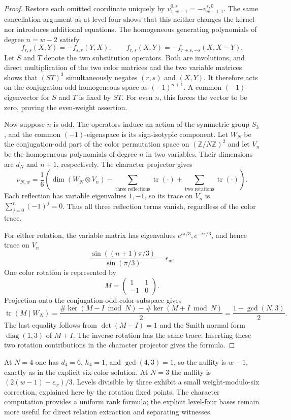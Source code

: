 \documentclass[11pt]{article}
\numberwithin{equation}{section}
\theoremstyle{plain}
\theoremstyle{definition}
\theoremstyle{remark}
\begin{document}
\begin{proof}
Restore each omitted coordinate uniquely by
$v^{0,s}_{1,w-1}=-v^{s,0}_{w-1,1}$. The same cancellation argument as
at level four shows that this neither changes the kernel nor introduces
additional equations. The homogeneous generating polynomials of degree
$n=w-2$ satisfy
\[
 f_{r,s}(X,Y)=-f_{s,r}(Y,X),\qquad
 f_{r,s}(X,Y)=-f_{r+s,-s}(X,X-Y).
\]
Let $S$ and $T$ denote the two substitution operators. Both are
involutions, and direct multiplication of the two color matrices and
the two variable matrices shows that $(ST)^3$ simultaneously negates
$(r,s)$ and $(X,Y)$. It therefore acts on the conjugation-odd homogeneous
space as $(-1)^{n+1}$. A common $(-1)$-eigenvector for $S$ and $T$ is
fixed by $ST$. For even $n$, this forces the vector to be zero, proving
the even-weight assertion.

Now suppose $n$ is odd. The operators induce an action of the symmetric
group $S_3$, and the common $(-1)$-eigenspace is its sign-isotypic
component. Let $W_N$ be the conjugation-odd part of the color permutation
space on $(\mathbb Z/N\mathbb Z)^2$ and let $V_n$ be the homogeneous
polynomials of degree $n$ in two variables. Their dimensions are $d_N$
and $n+1$, respectively. The character projector gives
\[
 \nu_{N,w}=\frac16\left(
 \dim(W_N\otimes V_n)
 -\sum_{\text{three reflections}}\operatorname{tr}(\cdot)
 +\sum_{\text{two rotations}}\operatorname{tr}(\cdot)\right).
\]
Each reflection has variable eigenvalues $1,-1$, so its trace on
$V_n$ is $\sum_{j=0}^n(-1)^j=0$. Thus all three reflection terms vanish,
regardless of the color trace.

For either rotation, the variable matrix has eigenvalues
$e^{i\pi/3},e^{-i\pi/3}$, and hence trace on $V_n$
\[
 \frac{\sin((n+1)\pi/3)}{\sin(\pi/3)}=\epsilon_w.
\]
One color rotation is represented by
\[
 M=\begin{pmatrix}1&1\\-1&0\end{pmatrix}.
\]
Projection onto the conjugation-odd color subspace gives
\[
 \operatorname{tr}(M\mid W_N)
 =\frac{\#\ker(M-I\bmod N)-\#\ker(M+I\bmod N)}2
 =\frac{1-\gcd(N,3)}2.
\]
The last equality follows from $\det(M-I)=1$ and the Smith normal form
$\operatorname{diag}(1,3)$ of $M+I$. The inverse rotation has the same
trace. Inserting these two rotation contributions in the character
projector gives the formula.
\end{proof}

At $N=4$ one has $d_4=6$, $h_4=1$, and $\gcd(4,3)=1$, so the nullity
is $w-1$, exactly as in the explicit six-color solution. At $N=3$ the
nullity is $(2(w-1)-\epsilon_w)/3$. Levels divisible by three exhibit
a small weight-modulo-six correction, explained here by the rotation
fixed points. The character computation provides a uniform rank
formula; the explicit level-four bases remain more useful for direct
relation extraction and separating witnesses.
\end{document}
